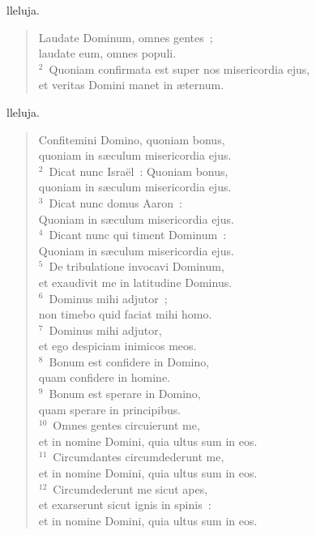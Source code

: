 \bchapter[Psalm]
lleluja. \begin{verse}Laudate Dominum, omnes gentes~;\\ laudate eum, omnes populi.\\
${}^{2}$~Quoniam confirmata est super nos misericordia ejus,\\ et veritas Domini manet in \ae ternum.\end{verse}



\bchapter[Psalm]
lleluja. \begin{verse}Confitemini Domino, quoniam bonus,\\ quoniam in s\ae culum misericordia ejus.\\
${}^{2}$~Dicat nunc Isra\"el~: Quoniam bonus,\\ quoniam in s\ae culum misericordia ejus.\\
${}^{3}$~Dicat nunc domus Aaron~:\\ Quoniam in s\ae culum misericordia ejus.\\
${}^{4}$~Dicant nunc qui timent Dominum~:\\ Quoniam in s\ae culum misericordia ejus.\\
${}^{5}$~De tribulatione invocavi Dominum,\\ et exaudivit me in latitudine Dominus.\\
${}^{6}$~Dominus mihi adjutor~;\\ non timebo quid faciat mihi homo.\\
${}^{7}$~Dominus mihi adjutor,\\ et ego despiciam inimicos meos.\\
${}^{8}$~Bonum est confidere in Domino,\\ quam confidere in homine.\\
${}^{9}$~Bonum est sperare in Domino,\\ quam sperare in principibus.\\
${}^{10}$~Omnes gentes circuierunt me,\\ et in nomine Domini, quia ultus sum in eos.\\
${}^{11}$~Circumdantes circumdederunt me,\\ et in nomine Domini, quia ultus sum in eos.\\
${}^{12}$~Circumdederunt me sicut apes,\\ et exarserunt sicut ignis in spinis~:\\ et in nomine Domini, quia ultus sum in eos.\\

\end{verse}
